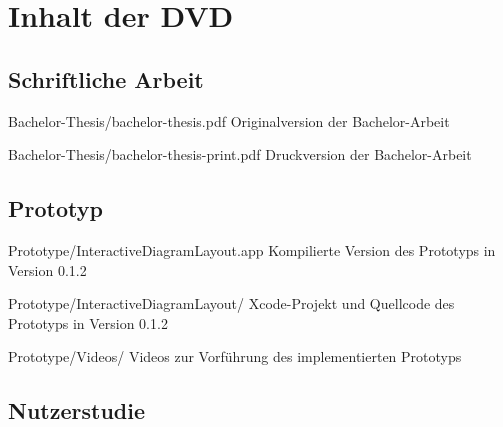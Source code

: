 
\chapter{Inhalt der DVD}
\label{chapter:dvd-content}

\newenvironment{fileslist}{
    \renewcommand\descriptionlabel[1]{\texttt{##1}}
    \setlength{\leftmargini}{0em}
    \begin{description}[style=nextline]
}{
    \end{description}
}

\section{Schriftliche Arbeit}

\begin{fileslist}

\item[Bachelor-Thesis/bachelor-thesis.pdf] 
Originalversion der Bachelor-Arbeit

\item[Bachelor-Thesis/bachelor-thesis-print.pdf] 
Druckversion der Bachelor-Arbeit

\end{fileslist}

\section{Prototyp}

\begin{fileslist}

\item[Prototype/InteractiveDiagramLayout.app]
Kompilierte Version des Prototyps in Version 0.1.2

\item[Prototype/InteractiveDiagramLayout/] 
Xcode-Projekt und Quellcode des Prototyps in Version 0.1.2

\item[Prototype/Videos/] 
Videos zur Vorführung des implementierten Prototyps

\end{fileslist}

\section{Nutzerstudie}

